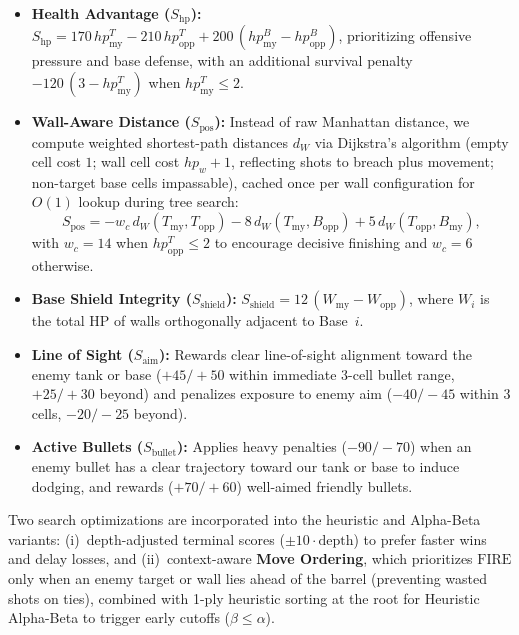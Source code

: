 \begin{itemize}
    \item \textbf{Health Advantage ($S_{\text{hp}}$):} $S_{\text{hp}} = 170\,hp^T_{\text{my}} - 210\,hp^T_{\text{opp}} + 200\,(hp^B_{\text{my}} - hp^B_{\text{opp}})$, prioritizing offensive pressure and base defense, with an additional survival penalty $-120\,(3 - hp^T_{\text{my}})$ when $hp^T_{\text{my}} \le 2$.
    \item \textbf{Wall-Aware Distance ($S_{\text{pos}}$):} Instead of raw Manhattan distance, we compute weighted shortest-path distances $d_W$ via Dijkstra's algorithm (empty cell cost $1$; wall cell cost $hp_w + 1$, reflecting shots to breach plus movement; non-target base cells impassable), cached once per wall configuration for $O(1)$ lookup during tree search:
    \begin{equation*}
    S_{\text{pos}} = -w_c\,d_W(T_{\text{my}}, T_{\text{opp}}) - 8\,d_W(T_{\text{my}}, B_{\text{opp}}) + 5\,d_W(T_{\text{opp}}, B_{\text{my}}),
    \end{equation*}
    with $w_c = 14$ when $hp^T_{\text{opp}} \le 2$ to encourage decisive finishing and $w_c = 6$ otherwise.
    \item \textbf{Base Shield Integrity ($S_{\text{shield}}$):} $S_{\text{shield}} = 12\,(W_{\text{my}} - W_{\text{opp}})$, where $W_i$ is the total HP of walls orthogonally adjacent to Base~$i$.
    \item \textbf{Line of Sight ($S_{\text{aim}}$):} Rewards clear line-of-sight alignment toward the enemy tank or base ($+45/+50$ within immediate 3-cell bullet range, $+25/+30$ beyond) and penalizes exposure to enemy aim ($-40/-45$ within 3 cells, $-20/-25$ beyond).
    \item \textbf{Active Bullets ($S_{\text{bullet}}$):} Applies heavy penalties ($-90/-70$) when an enemy bullet has a clear trajectory toward our tank or base to induce dodging, and rewards ($+70/+60$) well-aimed friendly bullets.
\end{itemize}

Two search optimizations are incorporated into the heuristic and Alpha-Beta variants: (i)~depth-adjusted terminal scores ($\pm 10 \cdot \text{depth}$) to prefer faster wins and delay losses, and (ii)~context-aware \textbf{Move Ordering}, which prioritizes $\text{FIRE}$ only when an enemy target or wall lies ahead of the barrel (preventing wasted shots on ties), combined with 1-ply heuristic sorting at the root for Heuristic Alpha-Beta to trigger early cutoffs ($\beta \le \alpha$).


